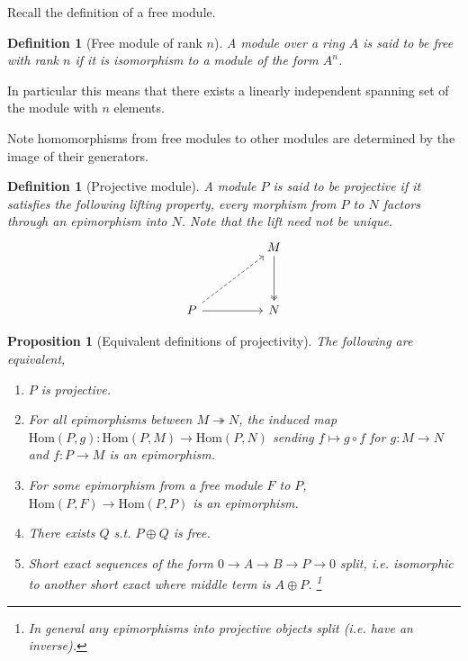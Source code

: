 \documentclass[12pt]{report}
\numberwithin{equation}{section}
\newcommand{\Hom}{{\mathrm{Hom}}}
\newcounter{dummy} \numberwithin{dummy}{section}
\newtheorem{definition}[dummy]{Definition}
\newtheorem{proposition}[dummy]{Proposition}
\begin{document}
	Recall the definition of a free module.
	\begin{definition}[Free module of rank $n$]
	A module over a ring $A$ is said to be free with rank $n$ if it is isomorphism to a module of the form $A^n$.
	\end{definition}In particular this means that there exists a linearly independent spanning set of the module with $n$ elements.
	
	Note homomorphisms from free modules to other modules are determined by the image of their generators.
	\begin{definition}[Projective module]
		A module $P$ is said to be {projective} if it satisfies the following lifting property, every morphism from $P$ to $N$ factors through an epimorphism into $N$. Note that the lift need not be unique.
		\[\begin{tikzcd}
			&& M \\
			\\
			P && N
			\arrow[two heads, from=1-3, to=3-3]
			\arrow[from=3-1, to=3-3]
			\arrow[dashed, from=3-1, to=1-3]
		\end{tikzcd}\]
	\end{definition}
	
	
	
	
	\begin{proposition}[Equivalent definitions of projectivity]\label{projtfae}
		The following are equivalent,
		\begin{enumerate}
			\item $P$ is projective.
			\item For all epimorphisms between $M\twoheadrightarrow N$, the induced map $\Hom(P,g):\mathrm{Hom}(P,M) \to \mathrm{Hom}(P,N)$ sending $f \mapsto g \circ f$ for $g:M \to N$ and $f:P \to M$ is an epimorphism.
			\item For some epimorphism from a free module $F$ to $P$, $\mathrm{Hom}(P,F) \to \mathrm{Hom}(P,P)$ is an epimorphism.
			\item There exists $Q$ s.t. $P \oplus Q$ is free.
			\item Short exact sequences of the form $0 \to A \to B \to P \to 0$ split, i.e. isomorphic to another short exact where middle term is $A \oplus P$. \footnote{In general any epimorphisms into projective objects split (i.e. have an inverse).}
		\end{enumerate}
	\end{proposition}
	
\end{document}
